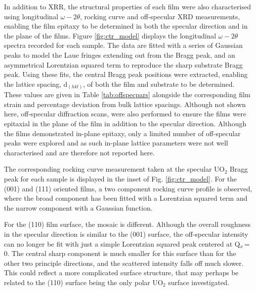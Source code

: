 \documentclass[twocolumn,prl,nobalancelastpage,aps,10pt]{revtex4-1}
\begin{document}
In addition to XRR, the structural properties of each film were also characterised using longitudinal $\omega -2\theta$, rocking curve and off-specular XRD measurements, enabling the film epitaxy to be determined in both the specular direction and in the plane of the films. Figure \ref{fig:ctr_model} displays the longitudinal $\omega-2\theta$ spectra recorded for each sample. The data are fitted with a series of Gaussian peaks to model the Laue fringes extending out from the Bragg peak, and an asymmetrical Lorentzian squared term to reproduce the sharp substrate Bragg peak. Using these fits, the central Bragg peak positions were extracted, enabling the lattice spacing, d$_{(hkl)}$, of both the film and substrate to be determined. These values are given in Table \ref{tab:offspecpars} alongside the corresponding film strain and percentage deviation from bulk lattice spacings. Although not shown here, off-specular diffraction scans, were also performed to ensure the films were epitaxial in the plane of the film in addition to the specular direction. Although the films demonstrated in-plane epitaxy, only a limited number of off-specular peaks were explored and as such in-plane lattice parameters were not well characterised and are therefore not reported here.

The corresponding rocking curve measurement taken at the specular UO$_2$ Bragg peak for each sample is displayed in the inset of Fig. \ref{fig:ctr_model}.  For the (001) and (111) oriented films, a two component rocking curve profile is observed, where the broad component has been fitted with a Lorentzian squared term and the narrow component with a Gaussian function.

For the (110) film surface, the mosaic is different. Although the overall roughness in the specular direction is similar to the (001) surface, the off-specular intensity can no longer be fit with just a simple Lorentzian squared peak centered at Q$_x$\,=\,0. The central sharp component is much smaller for this surface than for the other two principle directions, and the scattered intensity falls off much slower. This could reflect a more complicated surface structure, that may perhaps be related to the (110) surface being the only polar UO$_2$ surface investigated.
\end{document}
